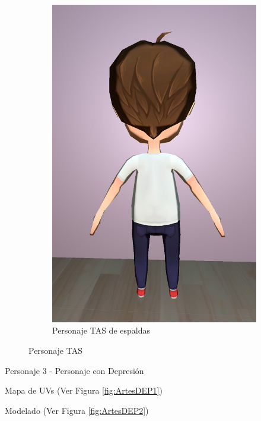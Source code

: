 \documentclass[12pt, a4paper,twoside,titlepage]{book}
\begin{document}
\begin{figure}
\begin{subfigure}{.5\textwidth}
  \includegraphics[width=.95\linewidth]{TGF/Artes/TAS_back.png}
  \caption{Personaje TAS de espaldas}
\end{subfigure}
\caption{Personaje TAS}
\label{fig:ArtesTAS2}
\end{figure}


Personaje 3 - Personaje con Depresión
 
 Mapa de UVs (Ver Figura \ref{fig:ArtesDEP1})
 
 Modelado (Ver Figura \ref{fig:ArtesDEP2})
 
\end{document}
